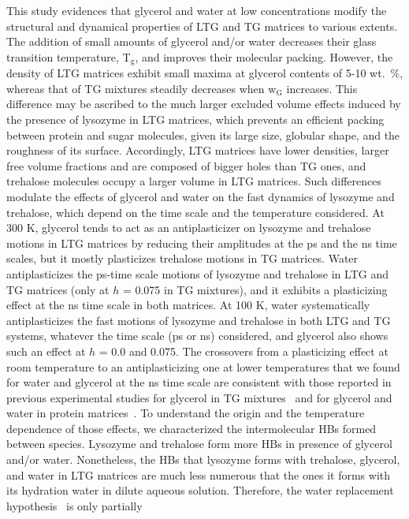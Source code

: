 \documentclass[journal=jpcbfk,manuscript=article]{achemso}
\begin{document}
\begin{singlespacing}
This study evidences that glycerol and water at low concentrations modify the structural and dynamical properties 
of LTG and TG matrices to various extents. The addition of small amounts of glycerol and/or water decreases their 
glass transition temperature, T$_{\textrm{g}}$, and improves their molecular packing. 
However, the density of LTG matrices exhibit small maxima at glycerol contents of 5-10 wt.~\%, 
whereas that of TG mixtures steadily decreases when w$_{\textrm{G}}$ increases. This difference may be ascribed 
to the much larger excluded volume effects induced by the presence of lysozyme in LTG matrices, which prevents an 
efficient packing between protein and sugar molecules, given its large size, globular shape, and the roughness of 
its surface. Accordingly, LTG matrices have lower densities, larger free volume fractions and are composed of 
bigger holes than TG ones, and trehalose molecules occupy a larger volume in LTG matrices. Such differences 
modulate the effects of glycerol and water on the fast dynamics of lysozyme and trehalose, which depend on the time 
scale and the temperature considered. At 300 K, glycerol tends to act as an antiplasticizer on lysozyme and 
trehalose motions in LTG matrices by reducing their amplitudes at the ps and the ns time scales, but it mostly
plasticizes trehalose motions in TG matrices. Water antiplasticizes the ps-time scale motions of lysozyme and 
trehalose in LTG and TG matrices (only at $h$ = 0.075 in TG mixtures), and it exhibits a plasticizing effect at 
the ns time scale in both matrices. At 100 K, water systematically antiplasticizes the fast motions of lysozyme 
and trehalose in both LTG and TG systems, whatever the time scale (ps or ns) considered, and glycerol also shows 
such an effect at $h$ = 0.0 and 0.075. The crossovers from a plasticizing effect at room temperature to an 
antiplasticizing one at lower temperatures that we found for water and glycerol at the ns time scale are consistent 
with those reported in previous experimental studies for glycerol in TG mixtures~\cite{Anopchenko2006,Obrzut2010} 
and for glycerol and water in protein matrices~\cite{Nickels2012,Sakai2013}. To understand the origin and the 
temperature dependence of those effects, we characterized the intermolecular HBs formed between species. Lysozyme 
and trehalose form more HBs in presence of glycerol and/or water. Nonetheless, the HBs that lysozyme forms with 
trehalose, glycerol, and water in LTG matrices are much less numerous that the ones it forms with its hydration 
water in dilute aqueous solution. Therefore, the water replacement hypothesis~\cite{Crowe1984b} is only partially 

\end{singlespacing}
\end{document}
